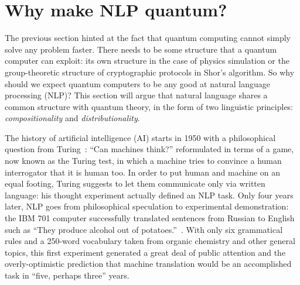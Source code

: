 
\section*{Why make NLP quantum?}


The previous section hinted at the fact that quantum computing cannot
simply solve any problem faster.
There needs to be some structure that a quantum computer can exploit:
its own structure in the case of physics simulation or the group-theoretic structure of cryptographic protocols in Shor's algorithm.
So why should we expect quantum computers to be any good at natural language processing (NLP)?
This section will argue that natural language shares a common structure with quantum theory, in the form of two linguistic principles: \emph{compositionality}
and \emph{distributionality}.

The history of artificial intelligence (AI) starts in 1950 with a philosophical question from Turing~\cite{Turing50}: ``Can machines think?'' reformulated in terms of a game, now known as the Turing test, in which a machine tries to convince a human interrogator that it is human too.
In order to put human and machine on an equal footing, Turing suggests to let them communicate only via written language: his thought experiment actually defined an NLP task.
Only four years later, NLP goes from philosophical speculation to experimental demonstration: the IBM 701 computer successfully translated sentences from Russian to English such as ``They produce alcohol out of potatoes.''~\cite{Hutchins04}.
With only six grammatical rules and a 250-word vocabulary taken from organic chemistry and other general topics, this first experiment generated a great deal of public attention and the overly-optimistic prediction that machine translation would be an accomplished task in ``five, perhaps three'' years.

